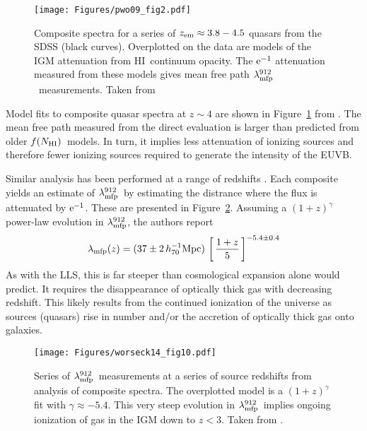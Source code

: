 \documentclass[graybox]{svmult}
\newcommand{\HI}{H{\sc I}}
\def\ltk{\left [ \,}
\def\rtk{\, \right  ] }
\newcommand{\mnhi}{N_{\rm HI}}
\def\mfnhi{f(\mnhi)}
\def\fnhi{$\mfnhi$}
\def\mlmfp{\lambda_{\rm mfp}^{912}}
\def\lmfp{$\mlmfp$}
\def\mzem{z_{\rm em}}
\begin{document}
%
\begin{figure}[b]
\sidecaption
\texttt{[image: Figures/pwo09\_fig2.pdf]}
%
%
\caption{Composite spectra for a series of $\mzem \approx 3.8-4.5$
quasars from the SDSS (black curves).  Overplotted on the
data are models of the IGM attenuation from \HI\ continuum
opacity.  The $\rm e^{-1}$ attenuation measured from these 
models gives mean free path \lmfp\ measurements.
Taken from \cite{pwo09}
}
\label{fig:pwo_fig2}       %
\end{figure}

Model fits to composite quasar spectra at $z \sim 4$ are 
shown in Figure~\ref{fig:pwo_fig2} from \cite{pwo09}.
The mean free path measured from the direct evaluation
is larger than predicted from older \fnhi\ models.
In turn, it implies
less attenuation of ionizing sources
and therefore fewer ionizing sources required to generate the 
intensity of the EUVB.


Similar analysis has been performed at a range of redshifts
\cite[]{omeara13,fop+13,worseck+14}.
Each composite yields an estimate of \lmfp\ by estimating the
distrance where the flux is attenuated by $\rm e^{-1}$.
These are presented in Figure~\ref{fig:w14_fig10}.
Assuming a $(1+z)^\gamma$ power-law evolution in \lmfp,
the authors report 
\begin{equation}
\lambda_{\rm mfp}(z) = (37 \pm 2 \, h_{70}^{-1} {\rm Mpc})
\, \ltk \frac{1+z}{5} \rtk^{-5.4 \pm 0.4}
\end{equation}
As with the LLS, this is far steeper than cosmological
expansion alone would predict.  It requires the disappearance
of optically thick gas with decreasing redshift.  This
likely results from the
continued ionization of the universe as sources (quasars)
rise in number and/or
the accretion of optically thick gas onto galaxies.

%
\begin{figure}[ht]
\sidecaption
\texttt{[image: Figures/worseck14\_fig10.pdf]}
%
%
\caption{Series of \lmfp\ measurements at a series of 
source redshifts from analysis of composite spectra.
The overplotted model is a $(1+z)^\gamma$ fit with
$\gamma \approx -5.4$.  This very steep evolution in
\lmfp\ implies ongoing ionization of gas in the IGM
down to $z < 3$.
Taken from \cite{worseck+14}.
}
\label{fig:w14_fig10}       %
\end{figure}
\end{document}

